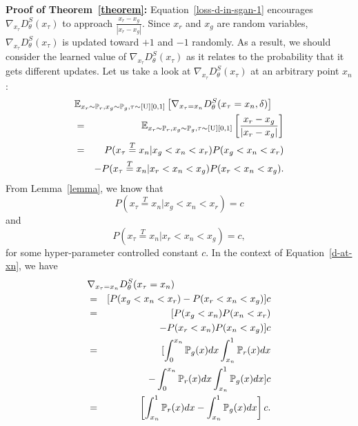 \documentclass[letterpaper]{article} %
\begin{document}
\noindent \textbf{Proof of Theorem~\ref{theorem}:}
Equation~\eqref{loss-d-in-sgan-1} encourages $\nabla_{x_{\tau}}D_{\theta}^S(x_{\tau})$ to approach $\frac{x_{r}-x_{g}}{|x_{r}-x_{g}|}$. Since $x_{r}$ and $x_{g}$ are random variables, $\nabla_{x_{\tau}}D_{\theta}^S(x_{\tau})$ is updated toward $+1$ and $-1$ randomly. As a result, we should consider the learned value of $\nabla_{x_{\tau}}D_{\theta}^S(x_{\tau})$ as it relates to the probability that it gets different updates.
Let us take a look at $\nabla_{x_{\tau}}D_{\theta}^S(x_{\tau})$ at an arbitrary point $x_n$:
\begin{eqnarray}\label{d-at-xn}
\lefteqn{\mathbb{E}_{x_r\sim\mathbb{P}_r,x_g\sim\mathbb{P}_g, \tau \sim [\text{U}][0,1]} \left[ \nabla_{x_{\tau}=x_n} D_{\theta}^S(x_{\tau}=x_n,\delta) \right]} \nonumber\\
    &=& \mathbb{E}_{x_r\sim\mathbb{P}_r,x_g\sim\mathbb{P}_g, \tau \sim [\text{U}][0,1]} \left[\frac{x_{r}-x_{g}}{|x_{r}-x_{g}|}\right] \nonumber\\
    &=& P(x_\tau\overset{T}{=}x_n|x_g<x_n<x_r) P(x_g<x_n<x_r) \\
    && - P(x_\tau\overset{T}{=}x_n|x_r<x_n<x_g) P(x_r<x_n<x_g).\nonumber
\end{eqnarray}
From Lemma~\ref{lemma}, we know that
\begin{equation}\label{p-inter-conditional-1}
  P(x_\tau\overset{T}{=}x_n|x_g<x_n<x_r)=c
\end{equation}
and
\begin{equation}\label{p-inter-conditional-2}
  P(x_\tau\overset{T}{=}x_n|x_r<x_n<x_g)=c,
\end{equation}
for some hyper-parameter controlled constant $c$. In the context of Equation~\eqref{d-at-xn}, we have
\begin{eqnarray}\label{explain-d-gradient}
\lefteqn{\nabla_{x_{\tau}=x_n} D_{\theta}^S(x_{\tau}=x_n)} \nonumber\\
    &=& [P(x_g<x_n<x_r) - P(x_r<x_n<x_g)]c \nonumber\\
    &=& [P(x_g<x_n)P(x_n<x_r) \nonumber\\
    && -  P(x_r<x_n)P(x_n<x_g) ]c \nonumber\\
    &=& [ \int_{0}^{x_n}\mathbb{P}_g(x)dx \int_{x_n}^{1}\mathbb{P}_r(x)dx  \nonumber\\
    && - \int_{0}^{x_n}\mathbb{P}_r(x)dx \int_{x_n}^{1}\mathbb{P}_g(x)dx ]c\nonumber\\
    &=& \left[\int_{x_n}^{1}\mathbb{P}_r(x)dx-\int_{x_n}^{1}\mathbb{P}_g(x)dx\right]c.
\end{eqnarray}
\end{document}
